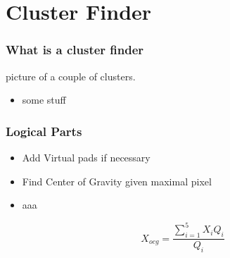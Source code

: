 \documentclass{beamer}
\begin{document}
\section{Cluster Finder}

\begin{frame}
\frametitle{What is a cluster finder} 
picture of a couple of clusters.
\begin{itemize}
\item some stuff

\end{itemize}

\end{frame}
\begin{frame}
  \frametitle{Logical Parts}
  \begin{itemize}
    \item Add Virtual pads if necessary  
    \item Find Center of Gravity given maximal pixel
      \item aaa
  \end{itemize}
  \begin{equation}
    X_{ocg}=\frac{\sum_{i=1}^5 X_i Q_i}{Q_i}
  \end{equation}
\end{frame}
\end{document}
